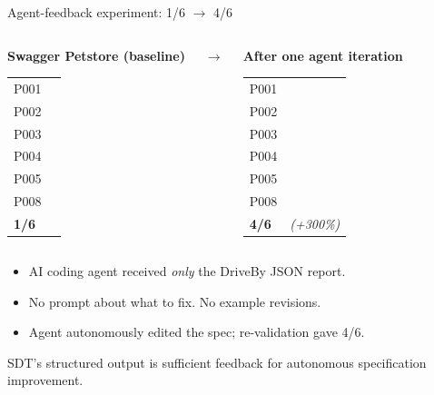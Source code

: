 \documentclass[10pt,aspectratio=169]{beamer}
\newcommand{\cmark}{\textcolor{green!60!black}{\ding{51}}}
\newcommand{\xmark}{\textcolor{red!70!black}{\ding{55}}}
\begin{document}
\begin{frame}{Agent-feedback experiment: 1/6 $\rightarrow$ 4/6}

\begin{columns}[c,onlytextwidth]

\begin{center}
\textbf{Swagger Petstore (baseline)}\\[1ex]
\footnotesize
\begin{tabular}{ll}
P001 & \cmark \\
P002 & \xmark \\
P003 & \xmark \\
P004 & \xmark \\
P005 & \xmark \\
P008 & \xmark \\
\hline
\textbf{1/6} &
\end{tabular}
\end{center}

\begin{center}\Large $\rightarrow$\end{center}

\begin{center}
\textbf{After one agent iteration}\\[1ex]
\footnotesize
\begin{tabular}{ll}
P001 & \cmark \\
P002 & \cmark \\
P003 & \cmark \\
P004 & \cmark \\
P005 & \xmark \\
P008 & \xmark \\
\hline
\textbf{4/6} & \footnotesize\itshape (+300\%)
\end{tabular}
\end{center}

\end{columns}

\vspace{1.5em}
\footnotesize
\begin{itemize}\setlength\itemsep{0.3em}
\item AI coding agent received \emph{only} the DriveBy JSON report.
\item No prompt about what to fix. No example revisions.
\item Agent autonomously edited the spec; re-validation gave 4/6.
\end{itemize}

\vspace{0.5em}
\begin{center}
\alert{SDT's structured output is sufficient feedback for autonomous
specification improvement.}
\end{center}

\end{frame}
\end{document}
